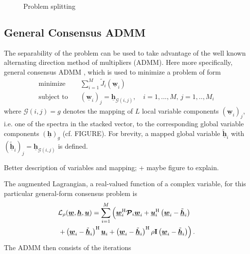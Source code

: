 \documentclass{article}
\newcommand{\hf}{\underline{\bm{h}}}
\newcommand{\wf}{\underline{\bm{w}}}
\newcommand{\uuf}{\underline{\bm{u}}}
\newcommand{\aRhof}{\bm{\mathcal{P}}}
\newcommand{\I}{\mtxb{I}}
\begin{document}
\begin{figure}
    \centering
    
    \caption{Problem splitting}
    \label{fig:problem_splitting:problem_splitting_matrix}
\end{figure}

\subsection{General Consensus ADMM}
\label{ssec:general_consensus_admm}
The separability of the problem can be used to take advantage of the well known alternating direction method of multipliers (ADMM).
Here more specifically, general consensus ADMM \cite{}, which is used to minimize a problem of form
\begin{align}
    \operatorname{minimize} \quad &\sum_{i=1}^{M} \tilde{J}_i(\wf_i)\\
    \text{subject to} \quad &(\wf_i)_j = \hf_{\mathcal{G}(i,j)},\quad i=1,...,M,\,j=1,..,M_i
\end{align}
where \(\mathcal{G}(i,j)=g\) denotes the mapping of \(L\) local variable components \((\wf_i)_j\), i.e. one of the spectra in the stacked vector, to the corresponding global variable components \((\hf)_g\) (cf. FIGURE). For brevity, a mapped global variable \(\tilde{\hf}_i\) with \((\tilde{\hf}_i)_j = \hf_{\mathcal{G}(i,j)}\) is defined.
\begin{note}
    Better description of variables and mapping; + maybe figure to explain.
\end{note}
The augmented Lagrangian, a real-valued function of a complex variable, for this particular general-form consensus problem is
\begin{align}
    &\mathcal{L}_{\rho} (\wf,\hf,\uuf) = \sum_{i=1}^M \left( \wf_i^\herm \aRhof_i \wf_i + \uuf_i^{\herm} \left(\wf_i - \tilde{\hf}_i\right)\vphantom{+ \frac{\rho}{2} \left\| \wf_i - \tilde{\hf}_i \right\|^2} \right.\nonumber\\
    &\left. + \left(\wf_i - \tilde{\hf}_i\right)^\herm \uuf_i + \left( \wf_i - \tilde{\hf}_i \right)^\herm \rho \I \left( \wf_i - \tilde{\hf}_i \right) \right).\label{eq:general_consensus_admm:lagrangian}
\end{align}
The ADMM then consists of the iterations
\end{document}
